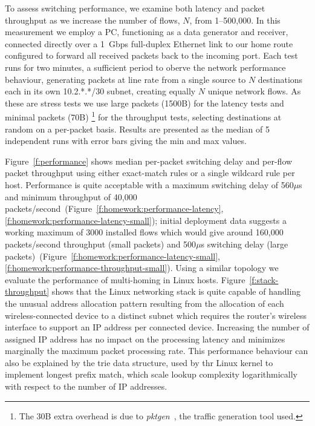 To assess switching performance, we examine both latency and packet throughput
as we increase the number of flows, $N$, from 1--500,000. In this measurement we
employ a PC, functioning as a data generator and receiver, connected directly
over a 1~Gbps full-duplex Ethernet link to our home route configured to forward all
received packets back to the incoming port. 
Each test runs for two minutes, a sufficient period to oberve the network
performance behaviour, generating packets at line rate from a single
source to $N$ destinations each in its own 10.2.*.*/30 subnet, creating equally
$N$ unique network flows.  As these are stress tests we use large packets
(1500B) for the latency tests and minimal packets (70B) \footnote{The 30B extra
  overhead is due to \emph{pktgen}~\cite{olsson05:_linux_packet_gener}, the
  traffic generation tool used.} for the throughput tests, selecting
destinations at random on a per-packet basis.  Results are presented as the
median of 5 independent runs with error bars giving the min and max values. 

Figure~\ref{f:performance} shows median per-packet switching delay and per-flow
packet throughput using either exact-match rules or a single wildcard rule per
host.  Performance is quite acceptable with a maximum switching delay of
560$\mu$s and minimum throughput of 40,000
packets/second~(Figure~\ref{f:homework:performance-latency},\ref{f:homework:performance-latency-small});
initial deployment data suggests a working maximum of 3000 installed flows which
would give around 160,000 packets/second throughput (small packets) and
500$\mu$s switching delay (large
packets)~(Figure~\ref{f:homework:performance-latency-small},\ref{f:homework:performance-throughput-small}).
Using a similar topology we evaluate the performance of multi-homing in Linux hosts.
Figure~\ref{f:stack-throughput} shows that the Linux
networking stack is quite capable of handling the unusual address allocation
pattern resulting from the allocation of each wireless-connected device to a
distinct subnet which requires the router's wireless interface to support an IP
address per connected device. Increasing the number of assigned IP address has
no impact on the processing latency and minimizes marginally the maximum packet
processing rate. This performance behaviour can also be explained by the trie
data structure, used by thr Linux kernel to implement longest prefix match, which scale
lookup complexity logarithmically with respect to the number of IP addresses. 

